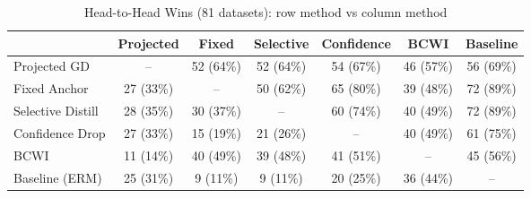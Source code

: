 \begin{table}[t]
\centering
\caption{Head-to-Head Wins (81 datasets): row method vs column method}
\label{tab:head-to-head}
\begin{tabular}{lcccccc}
\toprule
 & Projected & Fixed & Selective & Confidence & BCWI & Baseline \\
\midrule
Projected GD & -- & 52 (64\%) & 52 (64\%) & 54 (67\%) & 46 (57\%) & 56 (69\%) \\
Fixed Anchor & 27 (33\%) & -- & 50 (62\%) & 65 (80\%) & 39 (48\%) & 72 (89\%) \\
Selective Distill & 28 (35\%) & 30 (37\%) & -- & 60 (74\%) & 40 (49\%) & 72 (89\%) \\
Confidence Drop & 27 (33\%) & 15 (19\%) & 21 (26\%) & -- & 40 (49\%) & 61 (75\%) \\
BCWI & 11 (14\%) & 40 (49\%) & 39 (48\%) & 41 (51\%) & -- & 45 (56\%) \\
Baseline (ERM) & 25 (31\%) & 9 (11\%) & 9 (11\%) & 20 (25\%) & 36 (44\%) & -- \\
\bottomrule
\end{tabular}
\end{table}